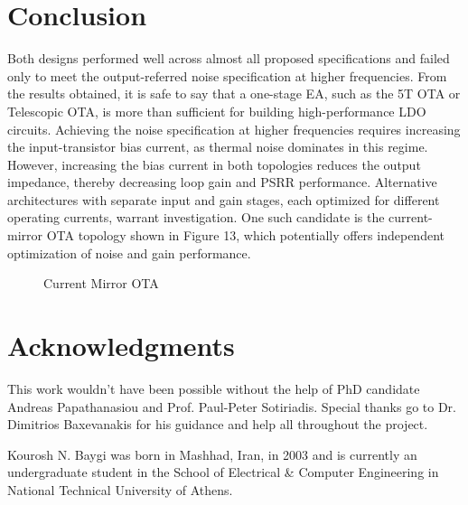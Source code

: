 \documentclass[journal]{IEEEtran}
\newcommand{\svg}[3]{
    \begin{figure}[!h]
        \centering
        
        \caption{#2}
    \end{figure}
}
\begin{document}
\section{Conclusion}
Both designs performed well across almost all proposed specifications and failed only to meet the output-referred noise specification at higher frequencies. From the results obtained, it is safe to say that a one-stage EA, such as the 5T OTA or Telescopic OTA, is more than sufficient for building high-performance LDO circuits. Achieving the noise specification at higher frequencies requires increasing the input-transistor bias current, as thermal noise dominates in this regime. However, increasing the bias current in both topologies reduces the output impedance, thereby decreasing loop gain and PSRR performance. Alternative architectures with separate input and gain stages, each optimized for different operating currents, warrant investigation. One such candidate is the current-mirror OTA topology shown in Figure 13, which potentially offers independent optimization of noise and gain performance.
\svg{../images/cm_ota.svg}{Current Mirror OTA}{0.8}

\section*{Acknowledgments}
This work wouldn't have been possible without the help of PhD candidate Andreas Papathanasiou and Prof. Paul-Peter Sotiriadis. Special thanks go to Dr. Dimitrios Baxevanakis for his guidance and help all throughout the project.


\nocite{*}


\begin{IEEEbiographynophoto}
{Kourosh N. Baygi} was born in Mashhad, Iran, in 2003 and is currently an undergraduate student in the School of Electrical \& Computer Engineering in National Technical University of Athens.
\end{IEEEbiographynophoto}
\end{document}

